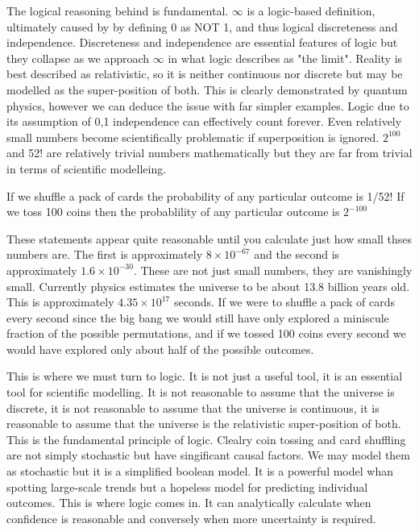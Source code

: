 \documentclass[12pt]{article}
\begin{document}
The logical reasoning behind \qbit{} is fundamental. $\infty$ is a logic-based definition, ultimately caused by by defining 0 as NOT 1, and thus logical discreteness and independence. Discreteness and independence are essential features of logic but they collapse as we approach $\infty$ in what logic describes as "the limit". Reality is best described as relativistic, so it is neither continuous nor discrete but may be modelled as the super-position of both. This is clearly demonstrated by quantum physics, however we can deduce the issue with far simpler examples. Logic due to its assumption of 0,1 independence can effectively count forever. Even relatively small numbers become scientifically problematic if \qbit{} superposition is ignored. $2^{100}$ and 52! are relatively trivial numbers mathematically but they are far from trivial in terms of scientific modelleing.

If we shuffle a pack of cards the probability of any particular outcome is 1/52!
If we toss 100 coins then the probablility of any particular outcome is $2^{-100}$

These statements appear quite reasonable until you calculate just how small thses numbers are. The first is approximately $8 \times 10^{-67}$ and the second is approximately $1.6 \times 10^{-30}$. These are not just small numbers, they are vanishingly small. Currently physics estimates the universe to be about 13.8 billion years old. This is approximately $4.35 \times 10^{17}$ seconds. If we were to shuffle a pack of cards every second since the big bang we would still have only explored a miniscule fraction of the possible permutations, and if we tossed 100 coins every second we would have explored only about half of the possible outcomes.

This is where we must turn to \qbit{} logic. It is not just a useful tool, it is an essential tool for scientific modelling. It is not reasonable to assume that the universe is discrete, it is not reasonable to assume that the universe is continuous, it is reasonable to assume that the universe is the relativistic super-position of both. This is the fundamental principle of \qbit{} logic. Clealry coin tossing and card shuffling are not simply stochastic but have singificant causal factors. We may model them as stochastic but it is a simplified boolean model. It is a powerful model whan spotting large-scale trends but a hopeless model for predicting individual outcomes. This is where \qbit{} logic comes in. It can analytically calculate when confidence is reasonable and conversely when more uncertainty is required.
\end{document}
